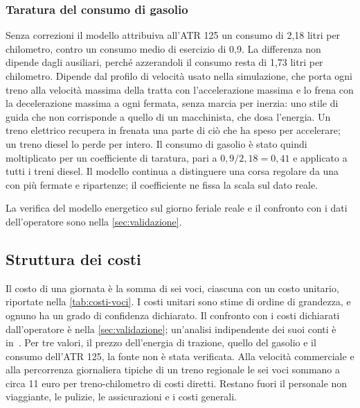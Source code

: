 \subsubsection{Taratura del consumo di gasolio}
Senza correzioni il modello attribuiva all'ATR 125 un consumo di 2,18 litri per chilometro, contro un consumo medio di esercizio di 0,9. La differenza non dipende dagli ausiliari, perché azzerandoli il consumo resta di 1,73 litri per chilometro. Dipende dal profilo di velocità usato nella simulazione, che porta ogni treno alla velocità massima della tratta con l'accelerazione massima e lo frena con la decelerazione massima a ogni fermata, senza marcia per inerzia: uno stile di guida che non corrisponde a quello di un macchinista, che dosa l'energia. Un treno elettrico recupera in frenata una parte di ciò che ha speso per accelerare; un treno diesel lo perde per intero. Il consumo di gasolio è stato quindi moltiplicato per un coefficiente di taratura, pari a $0{,}9 / 2{,}18 = 0{,}41$ e applicato a tutti i treni diesel. Il modello continua a distinguere una corsa regolare da una con più fermate e ripartenze; il coefficiente ne fissa la scala sul dato reale.

La verifica del modello energetico sul giorno feriale reale e il confronto con i dati dell'operatore sono nella \cref{sec:validazione}.

\subsection{Struttura dei costi}
Il costo di una giornata è la somma di sei voci, ciascuna con un costo unitario, riportate nella \cref{tab:costi-voci}. I costi unitari sono stime di ordine di grandezza, e ognuno ha un grado di confidenza dichiarato. Il confronto con i costi dichiarati dall'operatore è nella \cref{sec:validazione}; un'analisi indipendente dei suoi conti è in~\cite{traspol2021trenord}. Per tre valori, il prezzo dell'energia di trazione, quello del gasolio e il consumo dell'ATR 125, la fonte non è stata verificata. Alla velocità commerciale e alla percorrenza giornaliera tipiche di un treno regionale le sei voci sommano a circa 11 euro per treno-chilometro di costi diretti. Restano fuori il personale non viaggiante, le pulizie, le assicurazioni e i costi generali.

